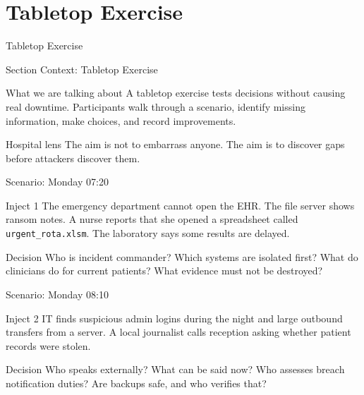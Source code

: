\documentclass[presentation]{beamer}
\newcommand{\sectiontitleframe}[1]{
\begin{frame}[plain,c]
\begin{center}
{\usebeamerfont{title}\usebeamercolor[fg]{title}#1}
\end{center}
\end{frame}
}
\begin{document}
\section{Tabletop Exercise}
\sectiontitleframe{Tabletop Exercise}

\begin{frame}[c]{Section Context: Tabletop Exercise}
\begin{block}{What we are talking about}
A tabletop exercise tests decisions without causing real downtime. Participants walk through a
scenario, identify missing information, make choices, and record improvements.
\end{block}

\begin{exampleblock}{Hospital lens}
The aim is not to embarrass anyone. The aim is to discover gaps before attackers discover them.
\end{exampleblock}
\end{frame}

\begin{frame}[c]{Scenario: Monday 07:20}
\begin{block}{Inject 1}
The emergency department cannot open the EHR. The file server shows ransom notes. A nurse reports
that she opened a spreadsheet called \texttt{urgent\_rota.xlsm}. The laboratory says some results are
delayed.
\end{block}

\begin{exampleblock}{Decision}
Who is incident commander? Which systems are isolated first? What do clinicians do for current
patients? What evidence must not be destroyed?
\end{exampleblock}
\end{frame}

\begin{frame}[c]{Scenario: Monday 08:10}
\begin{block}{Inject 2}
IT finds suspicious admin logins during the night and large outbound transfers from a server. A
local journalist calls reception asking whether patient records were stolen.
\end{block}

\begin{exampleblock}{Decision}
Who speaks externally? What can be said now? Who assesses breach notification duties? Are backups
safe, and who verifies that?
\end{exampleblock}
\end{frame}
\end{document}
